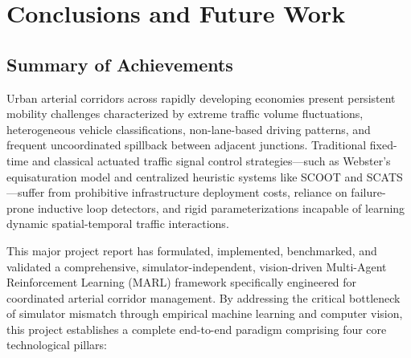 \chapter{Conclusions and Future Work}
\label{ch:conclusion}

\section{Summary of Achievements}
\label{sec:summary_achievements}
Urban arterial corridors across rapidly developing economies present persistent mobility challenges characterized by extreme traffic volume fluctuations, heterogeneous vehicle classifications, non-lane-based driving patterns, and frequent uncoordinated spillback between adjacent junctions. Traditional fixed-time and classical actuated traffic signal control strategies—such as Webster's equisaturation model and centralized heuristic systems like SCOOT and SCATS—suffer from prohibitive infrastructure deployment costs, reliance on failure-prone inductive loop detectors, and rigid parameterizations incapable of learning dynamic spatial-temporal traffic interactions.

This major project report has formulated, implemented, benchmarked, and validated a comprehensive, simulator-independent, vision-driven Multi-Agent Reinforcement Learning (MARL) framework specifically engineered for coordinated arterial corridor management. By addressing the critical bottleneck of simulator mismatch through empirical machine learning and computer vision, this project establishes a complete end-to-end paradigm comprising four core technological pillars:

